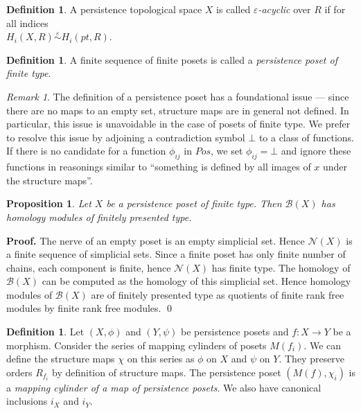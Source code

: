 \documentclass[english,12pt]{article}
\newcounter{stmcounter}[section]
\numberwithin{equation}{section}
\newtheorem{proposition}[stmcounter]{Proposition}
\theoremstyle{definition}
\newtheorem{definition}[stmcounter]{Definition}
\theoremstyle{remark}
\newtheorem{remark}[stmcounter]{Remark}
\newenvironment{pf}{\noindent\textbf{Proof.}}{\qed}
\newcommand{\define}[1]{{\textit{#1}}}
\begin{document}
\begin{definition}
  A persistence topological space $X$ is called \define{$\varepsilon$-acyclic} over $R$ if for all indices\\ $H_i(X,R) \stackrel{\varepsilon}{\sim} H_i(pt,R)$.
\end{definition}

\begin{definition}
  A finite sequence of finite posets is called a \define{persistence poset of finite type}.
\end{definition}

\begin{remark}
  The definition of a persistence poset has a foundational issue --- since there are no maps to an empty set, structure maps are in general not defined. In particular, this issue is unavoidable in the case of posets of finite type. We prefer to resolve this issue by adjoining a contradiction symbol $\bot$ to a class of functions. If there is no candidate for a function $\phi_{ij}$ in $Pos$, we set $\phi_{ij} = \bot$ and ignore these functions in reasonings similar to ``something is defined by all images of $x$ under the structure maps''.
\end{remark}

\begin{proposition}
  Let $X$ be a persistence poset of finite type. Then $\mathcal{B}(X)$ has homology modules of finitely presented type.
\end{proposition}

\begin{pf}
  The nerve of an empty poset is an empty simplicial set. Hence $\mathcal{N}(X)$ is a finite sequence of simplicial sets. Since a finite poset has only finite number of chains, each component is finite, hence $\mathcal{N}(X)$ has finite type. The homology of $\mathcal{B}(X)$ can be computed as the homology of this simplicial set. Hence homology modules of $\mathcal{B}(X)$ are of finitely presented type as quotients of finite rank free modules by finite rank free modules.
\end{pf}\\

\begin{definition}
  Let $(X, \phi)$ and $(Y, \psi)$ be persistence posets and $f : X \to Y$ be a morphism. Consider the series of mapping cylinders of posets $M(f_i)$. We can define the structure maps $\chi$ on this series as $\phi$ on $X$ and $\psi$ on $Y$. They preserve orders $R_{f_i}$ by definition of structure maps. The persistence poset $(M(f), \chi_i)$ is a \define{mapping cylinder of a map of persistence posets}. We also have canonical inclusions $i_X$ and $i_Y$.
\end{definition}
\end{document}
